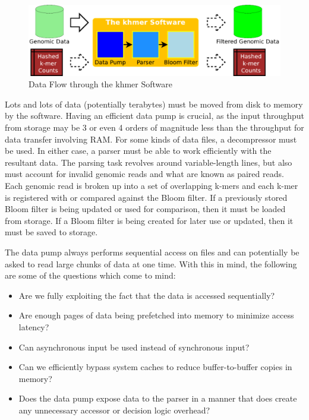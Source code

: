 \documentclass{article}
\begin{document}
\begin{figure}[ht!]
\centering
\includegraphics[scale=0.4]{data_flow.pdf}
\caption{Data Flow through the khmer Software}
\label{khmerDataFlow}
\end{figure}

Lots and lots of data (potentially terabytes) must be moved from disk to memory by the software. Having an efficient data pump is crucial, as the input throughput from storage may be 3 or even 4 orders of magnitude less than the throughput for data transfer involving RAM. For some kinds of data files, a decompressor must be used. In either case, a parser must be able to work efficiently with the resultant data. The parsing task revolves around variable-length lines, but also must account for invalid genomic reads and what are known as paired reads. Each genomic read is broken up into a set of overlapping k-mers and each k-mer is registered with or compared against the Bloom filter. If a previously stored Bloom filter is being updated or used for comparison, then it must be loaded from storage. If a Bloom filter is being created for later use or updated, then it must be saved to storage.

The data pump always performs sequential access on files and can potentially be asked to read large chunks of data at one time. With this in mind, the following are some of the questions which come to mind:
\begin{itemize}
\item Are we fully exploiting the fact that the data is accessed sequentially?
\item Are enough pages of data being prefetched into memory to minimize access latency?
\item Can asynchronous input be used instead of synchronous input?
\item Can we efficiently bypass system caches to reduce buffer-to-buffer copies in memory?
\item Does the data pump expose data to the parser in a manner that does create any unnecessary accessor or decision logic overhead?
\end{itemize}
\end{document}

